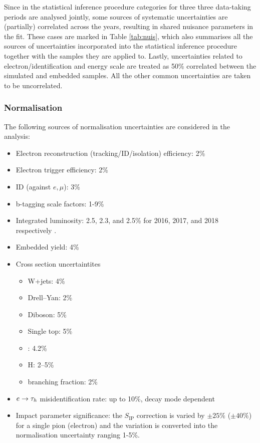 Since in the statistical inference procedure categories for three three data-taking periods are analysed jointly, some sources of systematic uncertainties are (partially) correlated across the years, resulting in shared nuisance parameters in the fit. These cases are marked in Table \ref{tab:nuis}, which also summarises all the sources of uncertainties incorporated into the statistical inference procedure together with the samples they are applied to. Lastly, uncertainties related to electron/\tauh identification and energy scale are treated as 50\% correlated between the simulated and embedded samples. All the other common uncertainties are taken to be uncorrelated.

\subsubsection{Normalisation}
The following sources of normalisation uncertainties are considered in the analysis:
\begin{itemize}
    \item Electron reconstruction (tracking/ID/isolation) efficiency: 2\%
    \item Electron trigger efficiency: 2\%
    \item \tauh ID (against $e,\mu$): 3\%
    \item b-tagging scale factors: 1-9\%
    \item Integrated luminosity: 2.5, 2.3, and 2.5\% for 2016, 2017, and 2018 respectively \cite{CMS:2017sdi, CMS:2018elu,CMS:2019jhq}.
    \item Embedded yield: 4\%
    \item Cross section uncertaintites
    \begin{itemize}
        \item W+jets: 4\%
        \item Drell–Yan: 2\%
        \item Diboson: 5\% \cite{CMS:2016jdy}
        \item Single top: 5\% \cite{CMS:2016lel}
        \item \ttbar: 4.2\%
        \item H: 2–5\% \cite{LHCHiggsCrossSectionWorkingGroup:2016ypw}
        \item \htt branching fraction: 2\% \cite{LHCHiggsCrossSectionWorkingGroup:2016ypw}
    \end{itemize}
    \item $e\to\tau_h$ misidentification rate: up to 10\%, decay mode dependent 
    \item Impact parameter significance: the $S_\text{IP}$ correction is varied by $\pm25\%$ ($\pm40\%$) for a single pion (electron) and the variation is converted into the normalisation uncertainty ranging 1-5\%.
\end{itemize}

